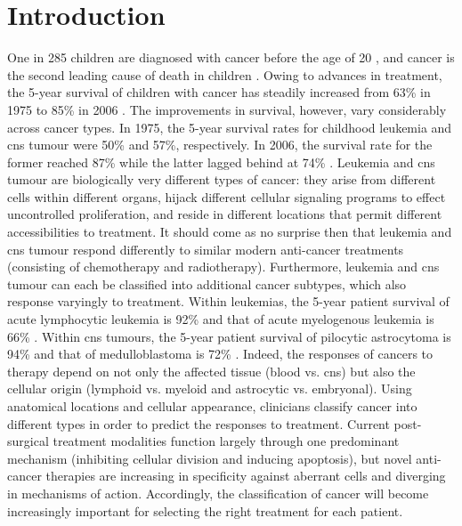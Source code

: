 \chapter{Introduction}
\label{ch:intro}

One in 285 children are diagnosed with cancer before the age of 20 , and cancer is the second leading cause of death in children . Owing to advances in treatment, the 5-year survival of children with cancer has steadily increased from 63\% in 1975 to 85\% in 2006 . The improvements in survival, however, vary considerably across cancer types. In 1975, the 5-year survival rates for childhood leukemia and \gls{cns} tumour were 50\% and 57\%, respectively. In 2006, the survival rate for the former reached 87\% while the latter lagged behind at 74\% . Leukemia and \gls{cns} tumour are biologically very different types of cancer: they arise from different cells within different organs, hijack different cellular signaling programs to effect uncontrolled proliferation, and reside in different locations that permit different accessibilities to treatment. It should come as no surprise then that leukemia and \gls{cns} tumour respond differently to similar modern anti-cancer treatments (consisting of chemotherapy and radiotherapy). Furthermore, leukemia and \gls{cns} tumour can each be classified into additional cancer subtypes, which also response varyingly to treatment. Within leukemias, the 5-year patient survival of acute lymphocytic leukemia is 92\% and that of acute myelogenous leukemia is 66\% . Within \gls{cns} tumours, the 5-year patient survival of pilocytic astrocytoma is 94\% and that of medulloblastoma is 72\% . Indeed, the responses of cancers to therapy depend on not only the affected tissue (blood vs. \gls{cns}) but also the cellular origin (lymphoid vs. myeloid and astrocytic vs. embryonal). Using anatomical locations and cellular appearance, clinicians classify cancer into different types in order to predict the responses to treatment. Current post-surgical treatment modalities function largely through one predominant mechanism (inhibiting cellular division and inducing apoptosis), but novel anti-cancer therapies are increasing in specificity against aberrant cells and diverging in mechanisms of action. Accordingly, the classification of cancer will become increasingly important for selecting the right treatment for each patient.

